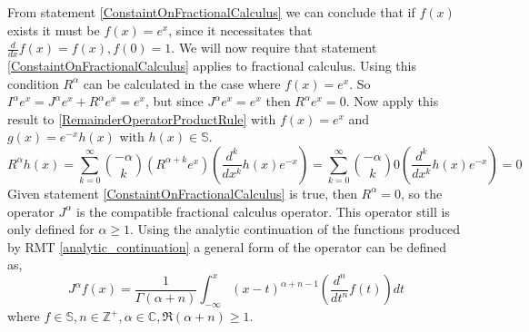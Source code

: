 \documentclass[%
 onecolumn,
 amsmath, amssymb, aps, pra, 10pt
]{revtex4-2}
\begin{document}
From statement \eqref{ConstaintOnFractionalCalculus} we can conclude that if $f(x)$ exists it must be $f(x) = e^x$, since it necessitates that $\frac{d}{dx}f(x) = f(x), f(0) = 1$. We will now require that statement \eqref{ConstaintOnFractionalCalculus} applies to fractional calculus. Using this condition $R^\alpha$ can be calculated in the case where $f(x) = e^x$. So $I^\alpha e^x = J^\alpha e^x + R^\alpha e^x = e^x$, but since $J^\alpha e^x = e^x$ then $R^\alpha e^x = 0$. Now apply this result to \eqref{RemainderOperatorProductRule} with $f(x) = e^x$ and $g(x) = e^{-x}h(x)$ with $h(x) \in \mathbb{S}$.
\[R^\alpha h(x) = \sum_{k=0}^\infty \binom{-\alpha}{k}\left( R^{\alpha + k}e^x \right)\left( \frac{d^k}{dx^k} h(x)e^{-x}\right) = \sum_{k=0}^\infty \binom{-\alpha}{k} 0 \left( \frac{d^k}{dx^k} h(x)e^{-x}\right) = 0\]
Given statement \eqref{ConstaintOnFractionalCalculus} is true, then $R^\alpha = 0$, so the operator $J^{\alpha}$ is the compatible fractional calculus operator. This operator still is only defined for $\mathfrak{\alpha} \geq 1$. Using the analytic continuation of the functions produced by RMT \eqref{analytic_continuation} a general form of the operator can be defined as,
\begin{equation}
J^{\alpha}f(x) = \frac{1}{\Gamma(\alpha+n)}\int_{-\infty}^x (x-t)^{\alpha+n-1}\left( \frac{d^n}{dt^n} f(t) \right)dt
\label{fractional_calculus}
\end{equation}
where $f \in \mathbb{S}, n \in \mathbb{Z}^+, \alpha \in \mathbb{C}, \mathfrak{R}(\alpha + n) \geq 1$.
\end{document}
